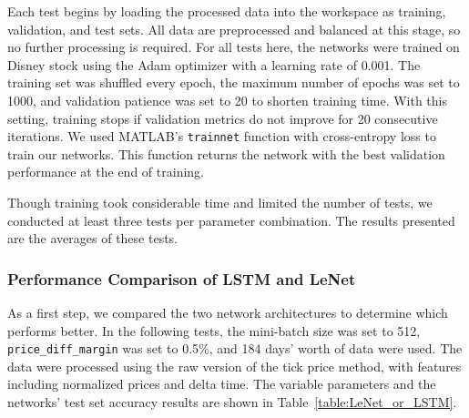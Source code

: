 \documentclass[a4paper,oneside,onecolumn,12pt]{book}
\begin{document}
	Each test begins by loading the processed data into the workspace as training, validation, and test sets. All data are preprocessed and balanced at this stage, so no further processing is required. For all tests here, the networks were trained on Disney stock using the Adam optimizer with a learning rate of 0.001. The training set was shuffled every epoch, the maximum number of epochs was set to 1000, and validation patience was set to 20 to shorten training time. With this setting, training stops if validation metrics do not improve for 20 consecutive iterations. We used MATLAB's \texttt{trainnet} function with cross-entropy loss to train our networks. This function returns the network with the best validation performance at the end of training.

	Though training took considerable time and limited the number of tests, we conducted at least three tests per parameter combination. The results presented are the averages of these tests.

		\subsubsection{Performance Comparison of LSTM and LeNet}
		As a first step, we compared the two network architectures to determine which performs better. In the following tests, the mini-batch size was set to 512, \texttt{price\_diff\_margin} was set to 0.5\%, and 184 days' worth of data were used. The data were processed using the raw version of the tick price method, with features including normalized prices and delta time. The variable parameters and the networks' test set accuracy results are shown in Table~\ref{table:LeNet_or_LSTM}.
		\begin{table}[H]
			\begin{center}
			\end{center}
			\caption{Comparison of LSTM and LeNet performance using the raw tick price method.}
			\label{table:LeNet_or_LSTM}
		\end{table}	
\end{document}

